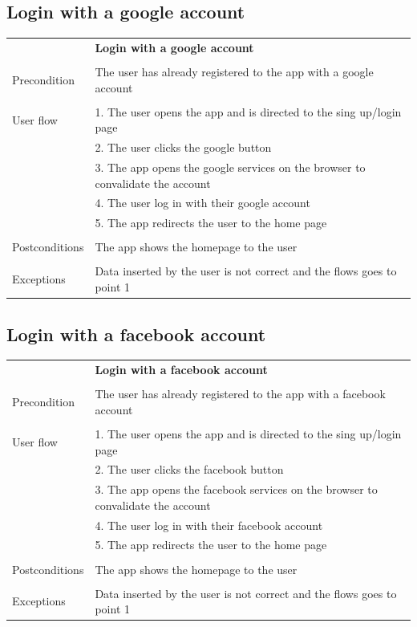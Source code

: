 \documentclass[10pt]{article}
\begin{document}
    \subsection{Login with a google account}
    \begin{tabular}{ p{3cm}|p{8cm} }
     & \textbf{Login with a google account} \\
     \\
     Precondition & The user has already registered to the app with a google account \\ 
     \\
     User flow  
     & 1. The user opens the app and is directed to the sing up/login page \\
     & 2. The user clicks the google button\\ 
     & 3. The app opens the google services on the browser to convalidate the account  \\
     & 4. The user log in with their google account\\
     & 5. The app redirects the user to the home page\\
     \\
     Postconditions & The app shows the homepage to the user \\ 
     \\
     Exceptions & Data inserted by the user is not correct and the flows goes to point 1\\
    \end{tabular}
    \newline
    \newline
    \newline
    \subsection{Login with a facebook account}
    \begin{tabular}{ p{3cm}|p{8cm} }
     & \textbf{Login with a facebook account} \\
     \\
     Precondition & The user has already registered to the app with a facebook account \\ 
     \\
     User flow 
     & 1. The user opens the app and is directed to the sing up/login page \\
     & 2. The user clicks the facebook button\\ 
     & 3. The app opens the facebook services on the browser to convalidate the account  \\
     & 4. The user log in with their facebook account\\
     & 5. The app redirects the user to the home page\\
     \\
     Postconditions & The app shows the homepage to the user \\
     \\
     Exceptions & Data inserted by the user is not correct and the flows goes to point 1\\
    \end{tabular}
    \newline
    \newline
    \newline
\end{document}
